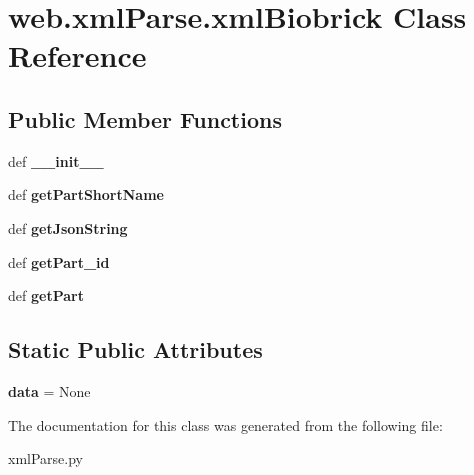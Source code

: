 \hypertarget{classweb_1_1xml_parse_1_1xml_biobrick}{\section{web.\-xml\-Parse.\-xml\-Biobrick Class Reference}
\label{classweb_1_1xml_parse_1_1xml_biobrick}
}
\subsection*{Public Member Functions}
\begin{DoxyCompactItemize}
\item 
\hypertarget{classweb_1_1xml_parse_1_1xml_biobrick_a62c1b73708521e5eec64b785194a9422}{def {\bfseries \-\_\-\-\_\-init\-\_\-\-\_\-}}\label{classweb_1_1xml_parse_1_1xml_biobrick_a62c1b73708521e5eec64b785194a9422}

\item 
\hypertarget{classweb_1_1xml_parse_1_1xml_biobrick_ae9040f8ed87b2e698cb63e9b4fab3d75}{def {\bfseries get\-Part\-Short\-Name}}\label{classweb_1_1xml_parse_1_1xml_biobrick_ae9040f8ed87b2e698cb63e9b4fab3d75}

\item 
\hypertarget{classweb_1_1xml_parse_1_1xml_biobrick_a3e0ccbf80876c290597452660913b925}{def {\bfseries get\-Json\-String}}\label{classweb_1_1xml_parse_1_1xml_biobrick_a3e0ccbf80876c290597452660913b925}

\item 
\hypertarget{classweb_1_1xml_parse_1_1xml_biobrick_ad800d3d899a74bb14c654e3368a1f7df}{def {\bfseries get\-Part\-\_\-id}}\label{classweb_1_1xml_parse_1_1xml_biobrick_ad800d3d899a74bb14c654e3368a1f7df}

\item 
\hypertarget{classweb_1_1xml_parse_1_1xml_biobrick_ace660bfcc46553657af47043911c7490}{def {\bfseries get\-Part}}\label{classweb_1_1xml_parse_1_1xml_biobrick_ace660bfcc46553657af47043911c7490}

\end{DoxyCompactItemize}
\subsection*{Static Public Attributes}
\begin{DoxyCompactItemize}
\item 
\hypertarget{classweb_1_1xml_parse_1_1xml_biobrick_a5432396f6045ec97745273417f021a26}{{\bfseries data} = None}\label{classweb_1_1xml_parse_1_1xml_biobrick_a5432396f6045ec97745273417f021a26}

\end{DoxyCompactItemize}


The documentation for this class was generated from the following file\-:\begin{DoxyCompactItemize}
\item 
xml\-Parse.\-py\end{DoxyCompactItemize}
